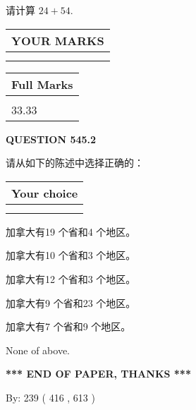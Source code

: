 \documentclass{ctexart}
\begin{document}
  
 
请计算 $ %
24 +  %
54 $.
 

 

 
  
\vspace{0.2in}
  
\noindent\begin{tabular}{|l|}
\hline
 YOUR MARKS  \\
\hline
 \\ 
 \\ 
\hline
\end{tabular}
\hspace{0.05in} \begin{tabular}{|l|}
\hline
 Full Marks  \\
\hline
 \\ 
33.33 \\
\hline
\end{tabular}
{\textbf{\Large{QUESTION
545.2 
}}}
  
  
请从如下的陈述中选择正确的：
  
  
\noindent\hspace{3.0in} \begin{tabular}{|l|}
\hline
Your choice \\
\hline
 \\ 
 \\ 
\hline
\end{tabular}
  
  
 
 
加拿大有19 个省和4 个地区。
 
 
加拿大有10 个省和3 个地区。
 
 
加拿大有12 个省和3 个地区。
 
 
加拿大有9 个省和23 个地区。
 
 
加拿大有7 个省和9 个地区。
 
 
 None of above.
 
 
   
   
 \vspace{0.2in}
 
   
   
   
   
\vspace{1.0in} 
{\textbf{\large{ *** END OF PAPER, THANKS *** }}} 
   
   
\hspace{1.0in} By: 
 239 ( 416 ,  613 )
   
\end{document}
